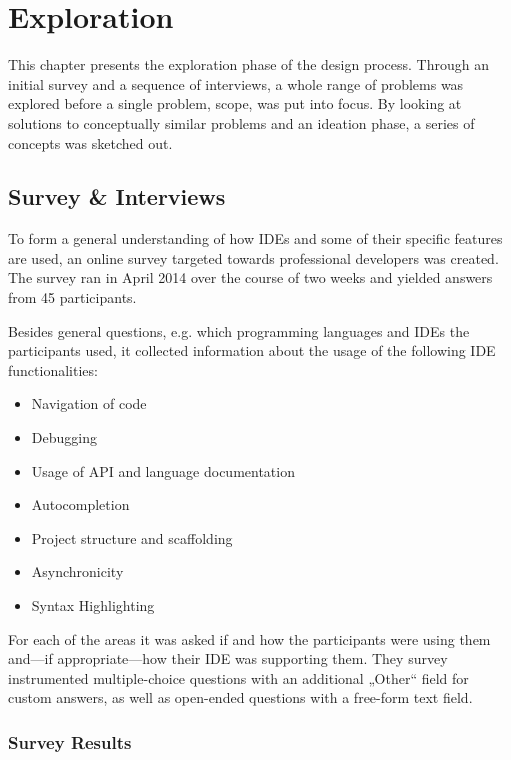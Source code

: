 \chapter{Exploration}\label{exploration}

This chapter presents the exploration phase of the design process.
Through an initial survey and a sequence of interviews, a whole range of
problems was explored before a single problem, scope, was put into
focus. By looking at solutions to conceptually similar problems and an
ideation phase, a series of concepts was sketched out.

\section{Survey \& Interviews}\label{survey-interviews}

To form a general understanding of how IDEs and some of their specific
features are used, an online survey targeted towards professional
developers was created. The survey ran in April 2014 over the course of
two weeks and yielded answers from 45 participants.

Besides general questions, e.g. which programming languages and IDEs the
participants used, it collected information about the usage of the
following IDE functionalities:

\begin{itemize}
\itemsep1pt\parskip0pt
\item
  Navigation of code
\item
  Debugging
\item
  Usage of API and language documentation
\item
  Autocompletion
\item
  Project structure and scaffolding
\item
  Asynchronicity
\item
  Syntax Highlighting
\end{itemize}

For each of the areas it was asked if and how the participants were
using them and—if appropriate—how their IDE was supporting them. They
survey instrumented multiple-choice questions with an additional „Other“
field for custom answers, as well as open-ended questions with a
free-form text field.

\subsection{Survey Results}\label{survey-results}


